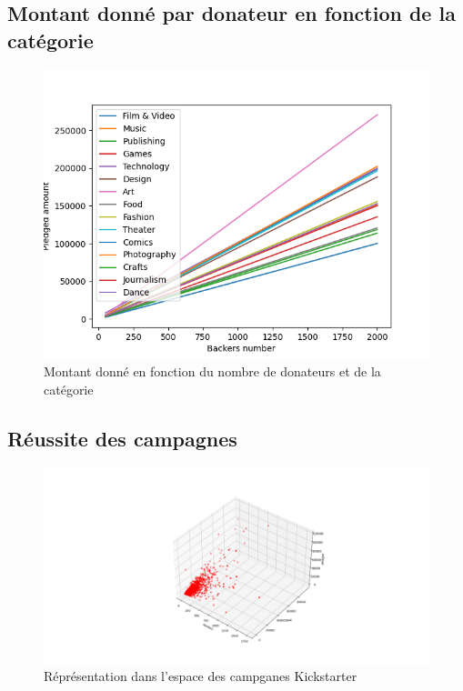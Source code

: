 \documentclass{article}
\begin{document}
\subsection{Montant donné par donateur en fonction de la catégorie}
\label{categorie}
\begin{figure}[htbp]
    \graphicspath{{graph/}} 
    \centerline{\includegraphics[scale=0.5]{main_category}}
    \caption{Montant donné en fonction du nombre de donateurs et de la catégorie}
    \label{fig_categorie}
\end{figure}

\subsection{Réussite des campagnes}
\label{reussite}
\begin{figure}[htbp]
    \graphicspath{{graph/}} 
    \centerline{\includegraphics[scale=0.5]{goal_pledged_backers}}
    \caption{Réprésentation dans l'espace des campganes Kickstarter}
    \label{fig_reussite}
\end{figure}
\end{document}
